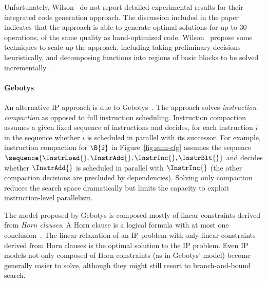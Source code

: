 \documentclass[acmsmall,authorversion,nonacm]{acmart}
\begin{document}
Unfortunately, Wilson~\etal{} do not report detailed experimental
results for their integrated code generation approach.
The discussion included in the paper indicates that the approach is
able to generate optimal solutions for up to 30 operations, of the
same quality as hand-optimized code.
Wilson~\etal{} propose some techniques to scale up the approach,
including taking preliminary decisions heuristically, and decomposing
functions into regions of basic blocks to be solved
incrementally~\cite{Wilson2002}.

\paragraph{Gebotys}

An alternative IP approach is due to Gebotys~\cite{Gebotys1997}.
The approach solves \emph{instruction compaction} as opposed to full
instruction scheduling.
Instruction compaction assumes a given fixed sequence of instructions
and decides, for each instruction $i$ in the sequence whether $i$ is
scheduled in parallel with its successor.
For example, instruction compaction for $\B{2}$ in
Figure~\ref{fig:sum-cfg} assumes the sequence
$\sequence{\InstrLoad{},\InstrAdd{},\InstrInc{},\InstrBlt{}}$ and
decides whether $\InstrAdd{}$ is scheduled in parallel with
$\InstrInc{}$ (the other compaction decisions are precluded by
dependencies).
Solving only compaction reduces the search space dramatically but
limits the capacity to exploit instruction-level parallelism.

The model proposed by Gebotys is composed mostly of linear constraints
derived from \emph{Horn clauses}.
A Horn clause is a logical formula with at most one
conclusion~\cite{Horn1951}.
The linear relaxation of an IP problem with only linear constraints
derived from Horn clauses is the optimal solution to the IP problem.
Even IP models not only composed of Horn constraints (as in Gebotys'
model) become generally easier to solve, although they might still
resort to branch-and-bound search.
\end{document}
